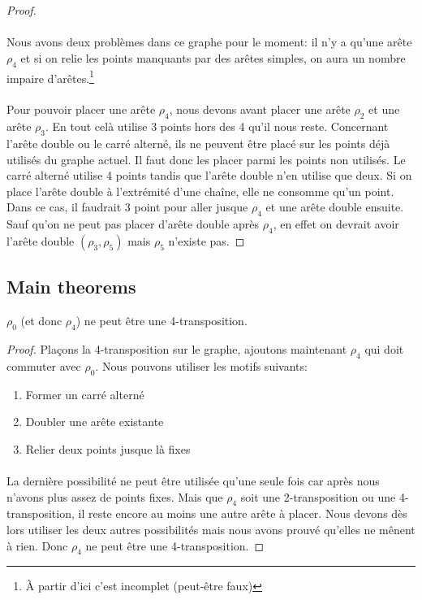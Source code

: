 \begin{proof}
  \paragraph{}
  Nous avons deux problèmes dans ce graphe pour le moment: il n'y a qu'une arête $\rho_4$ et si on relie les points manquants par des arêtes simples, on aura un nombre impaire d'arêtes.\footnote{À partir d'ici c'est incomplet (peut-être faux)}

  \paragraph{}
  Pour pouvoir placer une arête $\rho_4$, nous devons avant placer une arête $\rho_2$ et une arête $\rho_3$. En tout celà utilise 3 points hors des 4 qu'il nous reste. Concernant l'arête double ou le carré alterné, ils ne peuvent être placé sur les points déjà utilisés du graphe actuel. Il faut donc les placer parmi les points non utilisés. Le carré alterné utilise 4 points tandis que l'arête double n'en utilise que deux. Si on place l'arête double à l'extrémité d'une chaîne, elle ne consomme qu'un point. Dans ce cas, il faudrait 3 point pour aller jusque $\rho_4$ et une arête double ensuite. Sauf qu'on ne peut pas placer d'arête double après $\rho_4$, en effet on devrait avoir l'arête double $(\rho_3, \rho_5)$ mais $\rho_5$ n'existe pas.


\end{proof}

\subsection{Main theorems}

\begin{lemma}
  $\rho_0$ (et donc $\rho_4$) ne peut être une 4-transposition.
\end{lemma}

\begin{proof}
  Plaçons la 4-transposition sur le graphe, ajoutons maintenant $\rho_4$ qui doit commuter avec $\rho_0$. Nous pouvons utiliser les motifs suivants:
  \begin{enumerate}
    \item Former un carré alterné
    \item Doubler une arête existante
    \item Relier deux points jusque là fixes
  \end{enumerate}

  \paragraph{}
  La dernière possibilité ne peut être utilisée qu'une seule fois car après nous n'avons plus assez de points fixes. Mais que $\rho_4$ soit une 2-transposition ou une 4-transposition, il reste encore au moins une autre arête à placer. Nous devons dès lors utiliser les deux autres possibilités mais nous avons prouvé qu'elles ne mênent à rien. Donc $\rho_4$ ne peut être une 4-transposition.

\end{proof}

